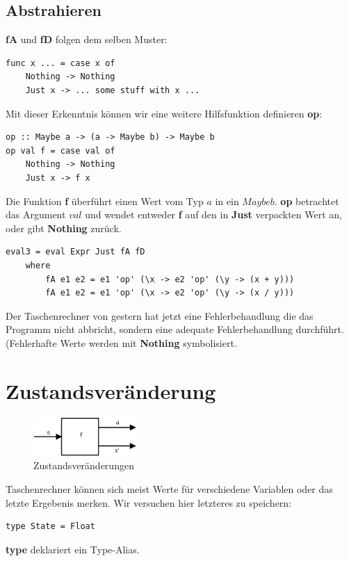 \documentclass[ngerman,a4paper]{report}
\begin{document}
\subsection{Abstrahieren}
\textbf{fA} und \textbf{fD} folgen dem selben Muster:
\begin{lstlisting}
func x ... = case x of
	Nothing -> Nothing
	Just x -> ... some stuff with x ...
\end{lstlisting}
Mit dieser Erkenntnis können wir eine weitere Hilfsfunktion definieren \textbf{op}:
\begin{lstlisting}
op :: Maybe a -> (a -> Maybe b) -> Maybe b
op val f = case val of
	Nothing -> Nothing
	Just x -> f x
\end{lstlisting}
Die Funktion \textbf{f} überführt einen Wert vom Typ $a$ in ein $Maybe b$. \textbf{op} betrachtet das Argument $val$ und wendet entweder \textbf{f} auf den in \textbf{Just} verpackten Wert an, oder gibt \textbf{Nothing} zurück.
\begin{lstlisting}
eval3 = eval Expr Just fA fD
	where 
		fA e1 e2 = e1 'op' (\x -> e2 'op' (\y -> (x + y)))
		fA e1 e2 = e1 'op' (\x -> e2 'op' (\y -> (x / y)))
\end{lstlisting}

Der Taschenrechner von gestern hat jetzt eine Fehlerbehandlung die das Programm nicht abbricht, sondern eine adequate Fehlerbehandlung durchführt. (Fehlerhafte Werte werden mit \textbf{Nothing} symbolisiert.\\

\section{Zustandsveränderung}

\begin{figure}[h]
	\centering
	\includegraphics[width=150px]{gfx/state_trans1.png}
	\caption{Zustandsveränderungen}
	\label{img:statetrans}
\end{figure}

Taschenrechner können sich meist Werte für verschiedene Variablen oder das letzte Ergebenis merken. Wir versuchen hier letzteres zu speichern:
\begin{lstlisting}
type State = Float
\end{lstlisting}
\textbf{type} deklariert ein Type-Alias.\\
\end{document}
